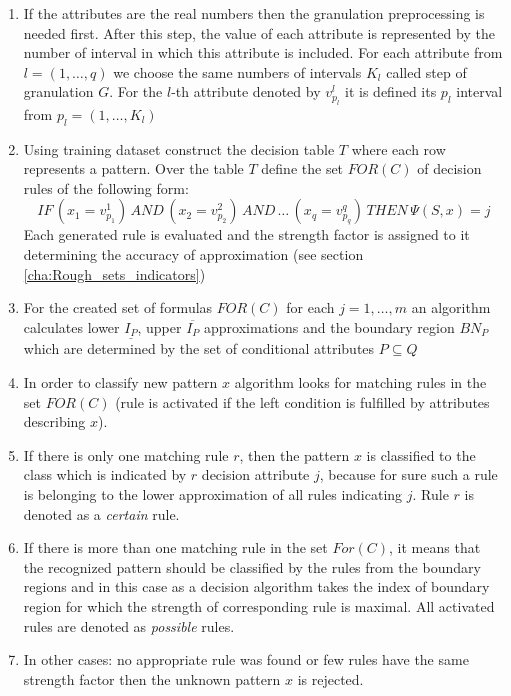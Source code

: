 \begin{enumerate}
    \item If the attributes are the real numbers then the granulation preprocessing 
        is needed first. After this step, the value of each attribute is represented 
        by the number of interval in which this attribute is included. For each
        attribute from $l=(1, \ldots , q)$ we choose the same numbers of
        intervals $K_l$ called step of granulation $G$. For the $l$-th attribute 
        denoted by $v^l_{p_l}$ it is defined its $p_l$ interval from $p_l=(1, \ldots, K_l)$
    \item Using training dataset construct the decision table $T$ where each
        row represents a pattern. Over the table $T$ define the set $FOR(C)$ of decision rules of
        the following form:
        $$IF \, (x_1 = v_{p_1}^1) \, AND \, (x_2=v_{p_2}^2) \, AND \, \ldots \,
        (x_q=v_{p_q}^q) \, THEN \, \Psi(S, x)=j$$
        Each generated rule is evaluated and the strength factor is assigned to
        it determining the accuracy of approximation (see section \ref{cha:Rough_sets_indicators})
    \item For the created set of formulas $FOR(C)$ for each $j=1, \ldots, m$
        an algorithm calculates lower $\underline{I_P}$, upper $\overline{I_P}$ approximations and the boundary
        region $BN_P$ which are determined by the set of conditional attributes $P
        \subseteq Q$
    \item In order to classify new pattern $x$ algorithm looks for matching rules in the
        set $FOR(C)$ (rule is activated if the left condition is fulfilled by
        attributes describing $x$).
    \item If there is only one matching rule $r$, then the pattern $x$ is
        classified to the class which is indicated by $r$ decision attribute $j$, 
        because for sure such a rule is belonging to the lower approximation of all rules 
        indicating $j$. Rule $r$ is denoted as a \textit{certain} rule.
    \item If there is more than one matching rule in the set $For(C)$, 
        it means that the recognized pattern should be classified by the 
        rules from the boundary regions and in this case as a decision
        algorithm takes the index of boundary region for which the strength of corresponding 
        rule is maximal. All activated rules are denoted as \textit{possible}
        rules.
    \item In other cases: no appropriate rule was found or few rules have the same strength
        factor then the unknown pattern $x$ is rejected.
\end{enumerate}
